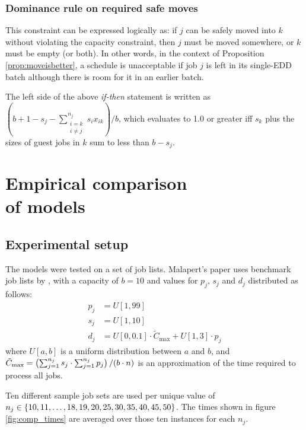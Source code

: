 \documentclass[13pt, letterpaper, oneside]{book}
\begin{document}
\subsection{Dominance rule on required safe moves}
This constraint can be expressed logically as: if $j$ can be safely moved into $k$
without violating the capacity constraint, then $j$ must be moved somewhere, or
$k$ must be empty (or both). In other words, in the context of Proposition
\ref{prop:moveisbetter}, a schedule is unacceptable if job $j$ is left in its
single-EDD batch although there is room for it in an earlier batch.

The left side of the above \textit{if-then} statement is written as $(b + 1 -
s_j - \sum_{\substack{{i = k}\\{i \neq j}}}^{n_j} s_i x_{ik}) / b$, which
evaluates to 1.0 or greater iff $s_k$ plus the sizes of guest jobs in $k$ sum to
less than $b - s_j$.




\chapter[Empirical comparison of models]{Empirical comparison\\ of models}
\section{Experimental setup}\label{sec:results}
The models were tested on a set of job lists. Malapert's paper uses benchmark
job lists by \citet{daste1, daste2}, with a capacity of $b = 10$ and values for
$p_j$, $s_j$ and $d_j$ distributed as follows:
\begin{align}
p_j &= U[1, 99] \\
s_j &= U[1, 10] \\
d_j &= U[0, 0.1] \cdot \tilde{C}_\text{max} + U[1, 3] \cdot p_j
\end{align}
where $U[a, b]$ is a uniform distribution between $a$ and $b$, and $\tilde{C}_\text{max} = \left( \sum_{j=1}^{n_j} s_j \cdot \sum_{j=1}^{n_j}
p_j \right) /\\ (b \cdot n)$ is an approximation of the time required to process
all jobs.

Ten different sample job sets are
used per unique value of $n_j \in \{10, 11, \dots, 18, 19, 20, 25,\\ 30, 35, 40, 45, 50\}$. The times shown in figure \ref{fig:comp_times}
are averaged over those ten instances for each $n_j$.
\end{document}
